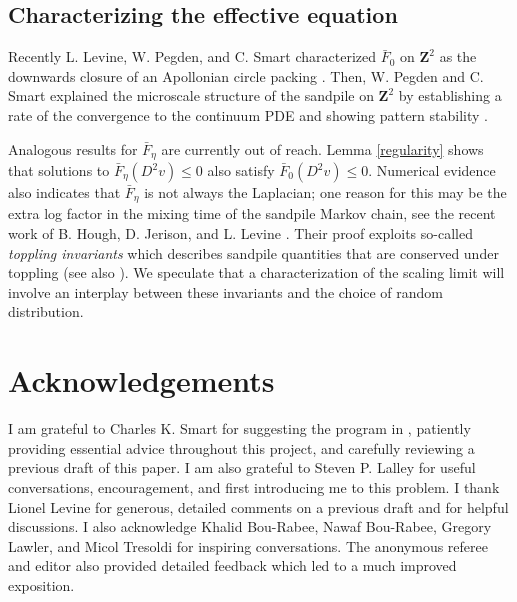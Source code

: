 \documentclass[12pt]{amsart}
\newcommand{\Z}{\mathbf{Z}}
\begin{document}
\subsection{Characterizing the effective equation} 
Recently L. Levine, W. Pegden, and C. Smart characterized $\bar{F}_0$ on $\Z^2$ as the downwards closure of an Apollonian circle packing \cite{levine2016apollonian, levine2017apollonian}. Then, W. Pegden and C. Smart explained the microscale structure of the sandpile on $\Z^2$ by establishing a rate of the convergence to the continuum PDE and showing pattern stability \cite{pegden2017stability}. 

Analogous results for $\bar{F}_{\eta}$ are currently out of reach. Lemma \ref{regularity} shows that solutions to $\bar{F}_\eta(D^2 v ) \leq 0$ also satisfy $\bar{F}_0(D^2 v) \leq 0$. Numerical evidence also indicates that $\bar{F}_{\eta}$ is not always the Laplacian; one reason for this may be the extra log factor in the mixing time of the sandpile Markov chain, see the recent work of B. Hough, D. Jerison, and L. Levine \cite{hough2019sandpiles}. Their proof exploits so-called {\it toppling invariants} 
which describes sandpile quantities that are conserved under toppling (see also \cite{dhar1995algebraic}). We speculate that a characterization of the scaling limit will involve an interplay between these invariants and the choice of random distribution.





\section*{Acknowledgements}
I am grateful to Charles K. Smart for suggesting the program in \cite{armstrong2014quantitative}, patiently providing essential advice throughout this project, and carefully reviewing a previous draft of this paper.
I am also grateful to Steven P. Lalley for useful conversations, encouragement, and first introducing me to this problem. I thank Lionel Levine for generous, detailed comments on a previous draft 
and for helpful discussions. I also acknowledge Khalid Bou-Rabee, Nawaf Bou-Rabee, Gregory Lawler, and Micol Tresoldi for inspiring conversations.  The anonymous referee and editor also provided detailed feedback which led to a much improved exposition.


{}

\end{document}
